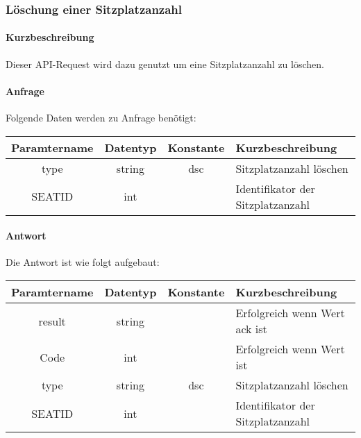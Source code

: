 \subsubsection{Löschung einer Sitzplatzanzahl}
\paragraph{Kurzbeschreibung}Dieser API-Request wird dazu genutzt um eine Sitzplatzanzahl zu löschen.
\paragraph{Anfrage}Folgende Daten werden zu Anfrage benötigt:
\begin{table}[H]
	\begin{tabular}{|c|c|c|p{6.5cm}|}
		\hline
		\textbf{Paramtername} & \textbf{Datentyp} & \textbf{Konstante} & \textbf{Kurzbeschreibung}                                                                                               \\ \hline
		type                & string            & dsc                & Sitzplatzanzahl löschen \\ \hline
		SEATID              & int               &                    & Identifikator der Sitzplatzanzahl \\ \hline
	\end{tabular}
\end{table}
\paragraph{Antwort}Die Antwort ist wie folgt aufgebaut:
\begin{table}[H]
	\begin{tabular}{|c|c|c|p{6.5cm}|}
		\hline
		\textbf{Paramtername} & \textbf{Datentyp} & \textbf{Konstante} & \textbf{Kurzbeschreibung}                                                                                               \\ \hline
		result              & string           &                 & Erfolgreich wenn Wert {\glqq ack\grqq} ist \\ \hline
		Code                & int              &                 & Erfolgreich wenn Wert {\glqq 0\grqq} ist \\ \hline
		type                & string           & dsc             & Sitzplatzanzahl löschen \\ \hline
		SEATID              & int              &                 & Identifikator der Sitzplatzanzahl \\ \hline
	\end{tabular}
\end{table}
